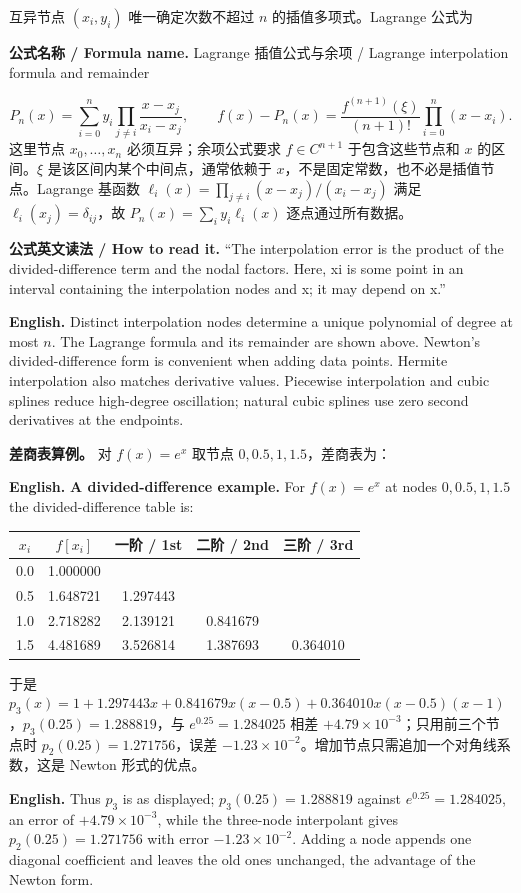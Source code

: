 \documentclass[UTF8,11pt,a4paper]{ctexart}
\newcommand{\EN}[1]{\par\noindent\textbf{English.} #1\par}
\newcommand{\READ}[1]{\par\noindent\textbf{公式英文读法 / How to read it.} #1\par}
\newcommand{\FORMULA}[2]{\par\noindent\textbf{公式名称 / Formula name.} #1 / #2\par}
\begin{document}
互异节点 $(x_i,y_i)$ 唯一确定次数不超过 $n$ 的插值多项式。Lagrange 公式为
\FORMULA{Lagrange 插值公式与余项}{Lagrange interpolation formula and remainder}
\[
P_n(x)=\sum_{i=0}^{n}y_i\prod_{j\ne i}\frac{x-x_j}{x_i-x_j},\qquad
f(x)-P_n(x)=\frac{f^{(n+1)}(\xi)}{(n+1)!}\prod_{i=0}^{n}(x-x_i).
\]
\noindent 这里节点 $x_0,\ldots,x_n$ 必须互异；余项公式要求 $f\in C^{n+1}$ 于包含这些节点和 $x$ 的区间。$\xi$ 是该区间内某个中间点，通常依赖于 $x$，不是固定常数，也不必是插值节点。Lagrange 基函数 $\ell_i(x)=\prod_{j\ne i}(x-x_j)/(x_i-x_j)$ 满足 $\ell_i(x_j)=\delta_{ij}$，故 $P_n(x)=\sum_i y_i\ell_i(x)$ 逐点通过所有数据。
\READ{“The interpolation error is the product of the divided-difference term and the nodal factors. Here, xi is some point in an interval containing the interpolation nodes and x; it may depend on x.”}
\EN{Distinct interpolation nodes determine a unique polynomial of degree at most $n$. The Lagrange formula and its remainder are shown above. Newton's divided-difference form is convenient when adding data points. Hermite interpolation also matches derivative values. Piecewise interpolation and cubic splines reduce high-degree oscillation; natural cubic splines use zero second derivatives at the endpoints.}

\noindent\textbf{差商表算例。} 对 $f(x)=e^x$ 取节点 $0,0.5,1,1.5$，差商表为：
\EN{\textbf{A divided-difference example.} For $f(x)=e^x$ at nodes $0,0.5,1,1.5$ the divided-difference table is:}
\begin{center}\footnotesize
\begin{tabular}{c c c c c}
\hline
$x_i$ & $f[x_i]$ & 一阶 / 1st & 二阶 / 2nd & 三阶 / 3rd\\
\hline
0.0 & 1.000000 & & &\\
0.5 & 1.648721 & 1.297443 & &\\
1.0 & 2.718282 & 2.139121 & 0.841679 &\\
1.5 & 4.481689 & 3.526814 & 1.387693 & 0.364010\\
\hline
\end{tabular}
\end{center}
\noindent 于是 $p_3(x)=1+1.297443x+0.841679x(x-0.5)+0.364010x(x-0.5)(x-1)$，$p_3(0.25)=1.288819$，与 $e^{0.25}=1.284025$ 相差 $+4.79\times10^{-3}$；只用前三个节点时 $p_2(0.25)=1.271756$，误差 $-1.23\times10^{-2}$。增加节点只需追加一个对角线系数，这是 Newton 形式的优点。
\EN{Thus $p_3$ is as displayed; $p_3(0.25)=1.288819$ against $e^{0.25}=1.284025$, an error of $+4.79\times10^{-3}$, while the three-node interpolant gives $p_2(0.25)=1.271756$ with error $-1.23\times10^{-2}$. Adding a node appends one diagonal coefficient and leaves the old ones unchanged, the advantage of the Newton form.}
\end{document}
